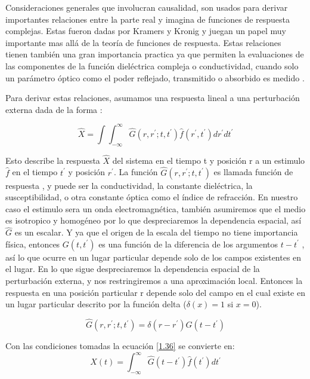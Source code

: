 \documentclass[a4paper,openright,12pt]{book}
\begin{document}
Consideraciones generales que involucran causalidad, son usados para derivar importantes relaciones entre la parte real y imagina de funciones de respuesta complejas. Estas fueron dadas por Kramers y Kronig y juegan un papel muy importante mas allá de la teoría de funciones de respuesta. Estas relaciones tienen también una gran importancia practica ya que permiten la evaluaciones de las componentes de la función dieléctrica compleja  o conductividad, cuando solo un parámetro óptico como el poder reflejado, transmitido o absorbido es medido \cite{electrodynamics}.

Para derivar estas relaciones, asumamos una respuesta lineal a una perturbación externa dada de la forma \cite{electrodynamics}:

\begin{equation}\label{1.36}
\hat{X}=\int\int_{-\infty}^{\infty}\hat{G}(r,r^{'};t,t^{'})\hat{f}(r^{'},t^{'})dr^{'}dt^{'}
\end{equation}

Esto describe la respuesta $\hat{X}$ del sistema en el tiempo t y posición r a un estimulo $\hat{f}$ en el tiempo $t^{'}$ y posición $r^{'}$. La función $\hat{G}(r,r^{'};t,t^{'})$ es llamada función de respuesta , y puede ser la conductividad, la constante dieléctrica, la susceptibilidad, o otra constante óptica como el índice de refracción. En nuestro caso  el estimulo sera un onda electromagnética, también asumiremos que el medio es isotropico y homogéneo por lo que despreciaremos la dependencia espacial, así $\hat{G}$ es un escalar. Y ya que el origen de la escala del tiempo no tiene importancia física, entonces $G(t,t^{'})$ es una función de la diferencia de los argumentos $t-t^{'}$ , así lo que ocurre en un lugar particular depende solo de los campos existentes en el lugar. En lo que sigue despreciaremos la dependencia espacial de la perturbación externa, y nos restringiremos a una aproximación local. Entonces la respuesta en una posición particular r depende solo del campo en el cual existe en un lugar particular descrito por la función delta ($\delta(x)=1$ si $x=0$). 

\begin{equation}\label{1.37}
\hat{G}(r,r^{'};t,t^{'})=\delta(r-r^{'})\hat{G}(t-t^{'})
\end{equation}

Con las condiciones tomadas la ecuación \ref{1.36} se convierte en:
\begin{equation}\label{1.38}
\hat{X}(t)=\int_{-\infty}^{\infty}\hat{G}(t-t^{'})\hat{f}(t^{'})dt^{'}
\end{equation}
\end{document}
